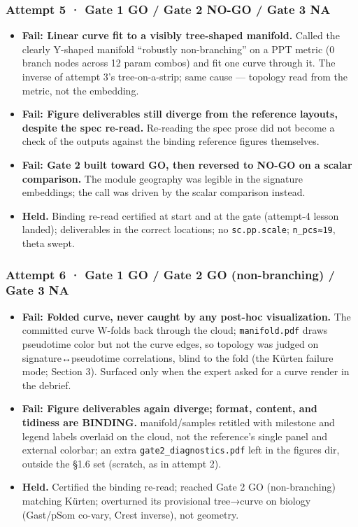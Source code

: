 \documentclass[11pt,a4paper]{article}
\providecommand{\tightlist}{\setlength{\itemsep}{0pt}\setlength{\parskip}{0pt}}
\begin{document}
\hypertarget{attempt-5-gate-1-go-gate-2-no-go-gate-3-na}{%
\subsubsection{Attempt 5 · Gate 1 GO / Gate 2 NO-GO / Gate 3
NA}\label{attempt-5-gate-1-go-gate-2-no-go-gate-3-na}}

\begin{itemize}
\tightlist
\item
  \textbf{Fail: Linear curve fit to a visibly tree-shaped manifold.}
  Called the clearly Y-shaped manifold ``robustly non-branching'' on a
  PPT metric (0 branch nodes across 12 param combos) and fit one curve
  through it. The inverse of attempt 3's tree-on-a-strip; same cause ---
  topology read from the metric, not the embedding.
\item
  \textbf{Fail: Figure deliverables still diverge from the reference
  layouts, despite the spec re-read.} Re-reading the spec prose did not
  become a check of the outputs against the binding reference figures
  themselves.
\item
  \textbf{Fail: Gate 2 built toward GO, then reversed to NO-GO on a
  scalar comparison.} The module geography was legible in the signature
  embeddings; the call was driven by the scalar comparison instead.
\item
  \textbf{Held.} Binding re-read certified at start and at the gate
  (attempt-4 lesson landed); deliverables in the correct locations; no
  \texttt{sc.pp.scale}; \texttt{n\_pcs≈19}, theta swept.
\end{itemize}

\hypertarget{attempt-6-gate-1-go-gate-2-go-non-branching-gate-3-na}{%
\subsubsection{Attempt 6 · Gate 1 GO / Gate 2 GO (non-branching) / Gate
3 NA}\label{attempt-6-gate-1-go-gate-2-go-non-branching-gate-3-na}}

\begin{itemize}
\tightlist
\item
  \textbf{Fail: Folded curve, never caught by any post-hoc
  visualization.} The committed curve W-folds back through the cloud;
  \texttt{manifold.pdf} draws pseudotime color but not the curve edges,
  so topology was judged on signature↔pseudotime correlations, blind to
  the fold (the Kürten failure mode; Section 3). Surfaced only when
  the expert asked for a curve render in the debrief.
\item
  \textbf{Fail: Figure deliverables again diverge; format, content,
  and tidiness are BINDING.} manifold/samples retitled with milestone
  and legend labels overlaid on the cloud, not the reference's single panel and external colorbar; an extra \texttt{gate2\_diagnostics.pdf}
  left in the figures dir, outside the §1.6 set (scratch, as in
  attempt 2).
\item
  \textbf{Held.} Certified the binding re-read; reached Gate 2 GO
  (non-branching) matching Kürten; overturned its provisional tree→curve
  on biology (Gast/pSom co-vary, Crest inverse), not geometry.
\end{itemize}
\end{document}
